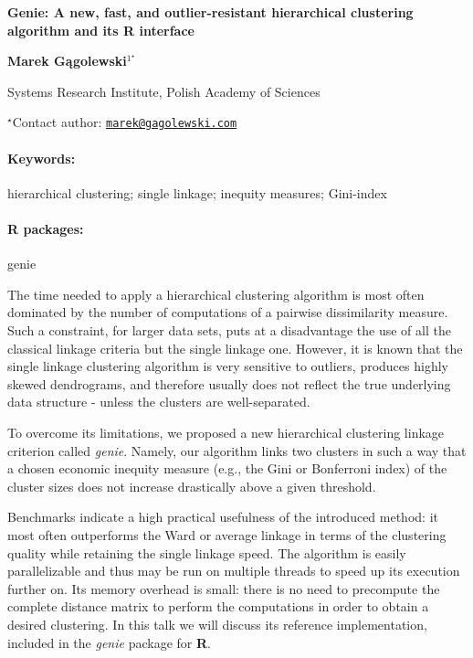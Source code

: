 \documentclass[11pt, a4paper]{article}
\renewcommand{\title}[1]{\begin{center}{\bf \LARGE #1}\end{center}}
\newcommand{\keywords}{\paragraph{Keywords:}}
\newcommand{\packages}{\paragraph{R packages:}}
\begin{document}
\pagestyle{empty}

\title{Genie: A new, fast, and outlier-resistant hierarchical clustering
algorithm and its R interface}

\begin{center}
  {\bf Marek Gągolewski$^{1^\star}$}
\end{center}

\vskip 0.3cm

\begin{affiliations}
\begin{enumerate}
\begin{minipage}{0.915\textwidth}
\centering
\item Systems Research Institute, Polish Academy of Sciences \\[-2pt]
\end{minipage}
\end{enumerate}
$^\star$Contact author: \href{mailto:marek@gagolewski.com}{\nolinkurl{marek@gagolewski.com}}\\
\end{affiliations}

\vskip 0.5cm

\begin{minipage}{0.915\textwidth}
\keywords hierarchical clustering; single linkage; inequity measures; Gini-index
\packages genie
\end{minipage}

\vskip 0.8cm

The time needed to apply a hierarchical clustering algorithm is most
often dominated by the number of computations of a pairwise
dissimilarity measure. Such a constraint, for larger data sets, puts at
a disadvantage the use of all the classical linkage criteria but the
single linkage one. However, it is known that the single linkage
clustering algorithm is very sensitive to outliers, produces highly
skewed dendrograms, and therefore usually does not reflect the true
underlying data structure - unless the clusters are well-separated.

To overcome its limitations, we proposed a new hierarchical clustering
linkage criterion called \emph{genie}. Namely, our algorithm links two
clusters in such a way that a chosen economic inequity measure (e.g.,
the Gini or Bonferroni index) of the cluster sizes does not increase
drastically above a given threshold.

Benchmarks indicate a high practical usefulness of the introduced
method: it most often outperforms the Ward or average linkage in terms
of the clustering quality while retaining the single linkage speed. The
algorithm is easily parallelizable and thus may be run on multiple
threads to speed up its execution further on. Its memory overhead is
small: there is no need to precompute the complete distance matrix to
perform the computations in order to obtain a desired clustering. In
this talk we will discuss its reference implementation, included in the
\emph{genie} package for \textbf{R}.
\end{document}
